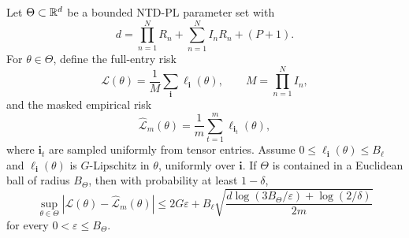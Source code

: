\begin{theorem}
\label{thm:masked-generalization}
Let \(\Theta\subset\mathbb{R}^d\) be a bounded NTD-PL parameter set with
\[
  d=
  \prod_{n=1}^{N}R_n
  +
  \sum_{n=1}^{N}I_nR_n
  +
  (P+1).
\]
For \(\theta\in\Theta\), define the full-entry risk
\[
  \mathcal L(\theta)
  =
  \frac{1}{M}\sum_{\mathbf i}\ell_{\mathbf i}(\theta),
  \qquad
  M=\prod_{n=1}^{N}I_n,
\]
and the masked empirical risk
\[
  \widehat{\mathcal L}_{m}(\theta)
  =
  \frac{1}{m}\sum_{t=1}^{m}
  \ell_{\mathbf i_t}(\theta),
\]
where \(\mathbf i_t\) are sampled uniformly from tensor entries. Assume
\(0\le \ell_{\mathbf i}(\theta)\le B_\ell\) and
\(\ell_{\mathbf i}(\theta)\) is \(G\)-Lipschitz in \(\theta\), uniformly over
\(\mathbf i\). If \(\Theta\) is contained in a Euclidean ball of radius
\(B_\Theta\), then with probability at least \(1-\delta\),
\[
  \sup_{\theta\in\Theta}
  \left|
  \mathcal L(\theta)-\widehat{\mathcal L}_{m}(\theta)
  \right|
  \le
  2G\varepsilon
  +
  B_\ell
  \sqrt{
  \frac{
  d\log(3B_\Theta/\varepsilon)+\log(2/\delta)}
  {2m}}
\]
for every \(0<\varepsilon\le B_\Theta\).
\end{theorem}


